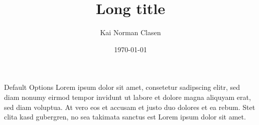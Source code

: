 \documentclass[aspectratio=169]{beamer}
\title[Default Options]{Long title}
\author{Kai Norman Clasen}
\institute{}
\date{\today}
\begin{document}
  \begin{frame}{Default Options}
    Lorem ipsum dolor sit amet, consetetur sadipscing elitr,
    sed diam nonumy eirmod tempor invidunt ut labore et dolore
    magna aliquyam erat, sed diam voluptua.
    At vero eos et accusam et justo duo dolores et ea rebum.
    Stet clita kasd gubergren, no sea takimata sanctus est
    Lorem ipsum dolor sit amet.
  \end{frame}
\end{document}
